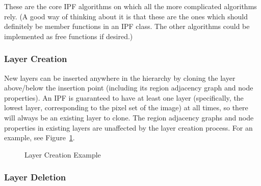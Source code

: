 These are the core IPF algorithms on which all the more complicated algorithms rely. (A good way of thinking about it is that these are the ones which should definitely be member functions in an IPF class. The other algorithms could be implemented as free functions if desired.)

\subsubsection{Layer Creation}

New layers can be inserted anywhere in the hierarchy by cloning the layer above/below the insertion point (including its region adjacency graph and node properties). An IPF is guaranteed to have at least one layer (specifically, the lowest layer, corresponding to the pixel set of the image) at all times, so there will always be an existing layer to clone. The region adjacency graphs and node properties in existing layers are unaffected by the layer creation process. For an example, see Figure~\ref{fig:ipfs-layercreation}.

\begin{figure}[H]
\begin{center}
	\hspace{4mm}%
\end{center}
\caption{Layer Creation Example}
\label{fig:ipfs-layercreation}
\end{figure}

\subsubsection{Layer Deletion}

